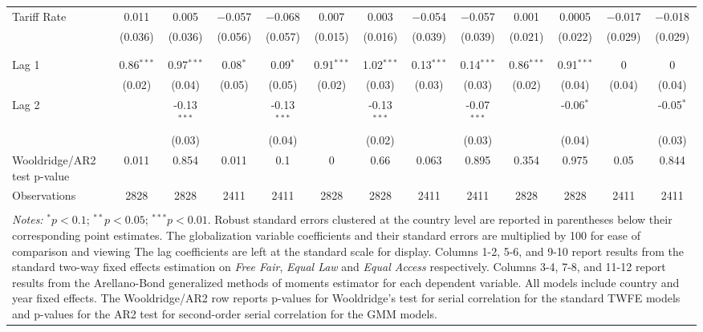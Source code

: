 \begin{table}
\begin{tabular}{@{\extracolsep{2pt}}lcccccccccccc}
 Tariff Rate & 0.011 & 0.005 & $-$0.057 & $-$0.068 & 0.007 & 0.003 & $-$0.054 & $-$0.057 & 0.001 & 0.0005 & $-$0.017 & $-$0.018 \\ 
  & (0.036) & (0.036) & (0.056) & (0.057) & (0.015) & (0.016) & (0.039) & (0.039) & (0.021) & (0.022) & (0.029) & (0.029) \\ 
  & & & & & & & & & & & & \\ 
\hline \\[-1.8ex] 
Lag 1 & 0.86$^{***}$ & 0.97$^{***}$ & 0.08$^{*}$ & 0.09$^{*}$ & 0.91$^{***}$ & 1.02$^{***}$ & 0.13$^{***}$ & 0.14$^{***}$ & 0.86$^{***}$ & 0.91$^{***}$ & 0 & 0 \\ 
 & (0.02) & (0.04) & (0.05) & (0.05) & (0.02) & (0.03) & (0.03) & (0.03) & (0.02) & (0.04) & (0.04) & (0.04) \\ 
Lag 2 &  & -0.13$^{***}$ &  & -0.13$^{***}$ &  & -0.13$^{***}$ &  & -0.07$^{***}$ &  & -0.06$^{*}$ &  & -0.05$^{*}$ \\ 
 &  & (0.03) &  & (0.04) &  & (0.02) &  & (0.03) &  & (0.04) &  & (0.03) \\ 
Wooldridge/AR2 test p-value & 0.011 & 0.854 & 0.011 & 0.1 & 0 & 0.66 & 0.063 & 0.895 & 0.354 & 0.975 & 0.05 & 0.844 \\ 
Observations & 2828 & 2828 & 2411 & 2411 & 2828 & 2828 & 2411 & 2411 & 2828 & 2828 & 2411 & 2411 \\ 
\hline 
\hline \\[-1.8ex] 
\multicolumn{13}{l}{\parbox{1.2\linewidth}{\textit{Notes:} $^{*}p<0.1$; $^{**}
            p<0.05$; $^{***} p<0.01$. Robust standard errors clustered at the
            country level are reported in parentheses below their corresponding
            point estimates. The globalization variable coefficients and their
            standard errors are multiplied by 100 for ease of comparison and
            viewing The lag coefficients are left at the standard scale for
            display. Columns 1-2, 5-6, and 9-10 report results from the standard
            two-way fixed effects estimation on \textit{Free Fair},
            \textit{Equal Law} and \textit{Equal Access} respectively. Columns
            3-4, 7-8, and 11-12 report results from the Arellano-Bond
            generalized methods of moments estimator for each dependent
            variable. All models include country and year fixed effects. The
            Wooldridge/AR2 row reports p-values for Wooldridge's test for
            serial correlation for the standard TWFE models and p-values for
            the AR2 test for second-order serial correlation for the GMM
            models.}} \\ 
\end{tabular} 
\end{table} 
